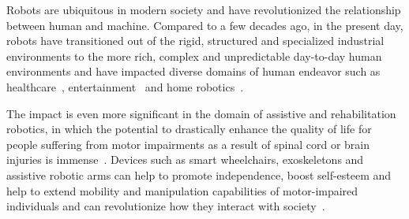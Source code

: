 \documentclass[12pt]{article}
\begin{document}
Robots are ubiquitous in modern society and have revolutionized the relationship between human and machine. Compared to a few decades ago, in the present day, robots have transitioned out of the rigid, structured and specialized industrial environments to the more rich, complex and unpredictable day-to-day human environments and have impacted diverse domains of human endeavor such as healthcare~\cite{laplante1992assistive}, entertainment~\cite{gopinath2016generative} and home robotics~\cite{fischinger2016hobbit}.


The impact is even more significant in the domain of assistive and rehabilitation robotics, in which the potential to drastically enhance the quality of life for people suffering from motor impairments as a result of spinal cord or brain injuries is immense~\cite{muelling2017autonomy}. Devices such as smart wheelchairs, exoskeletons and assistive robotic arms can help to promote independence, boost self-esteem and help to extend mobility and manipulation capabilities of motor-impaired individuals and can revolutionize how they interact with society~\cite{mataric2007socially}.
\end{document}
